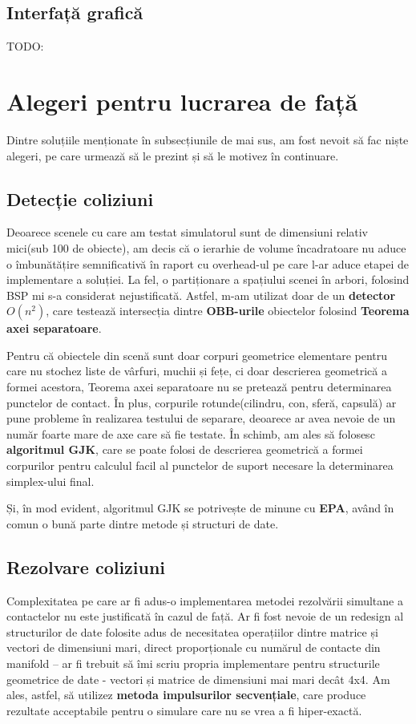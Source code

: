 \documentclass[12pt,a4paper]{report}
\begin{document}
\subsection{Interfață grafică}
TODO:
\section{Alegeri pentru lucrarea de față}

Dintre soluțiile menționate în subsecțiunile de mai sus, am fost nevoit să fac niște alegeri, pe care urmează să le prezint și să le motivez în continuare.

\subsection{Detecție coliziuni}

Deoarece scenele cu care am testat simulatorul sunt de dimensiuni relativ mici(sub 100 de obiecte), am decis că o ierarhie de volume încadratoare nu aduce o îmbunătățire semnificativă în raport cu overhead-ul pe care l-ar aduce etapei de implementare a soluției. La fel, o partiționare a spațiului scenei în arbori, folosind BSP mi s-a considerat nejustificată. Astfel, m-am utilizat doar de un \textbf{detector $O(n^2)$}, care testează intersecția dintre \textbf{OBB-urile} obiectelor folosind \textbf{Teorema axei separatoare}.

Pentru că obiectele din scenă sunt doar corpuri geometrice elementare pentru care nu stochez liste de vârfuri, muchii și fețe, ci doar descrierea geometrică a formei acestora, Teorema axei separatoare nu se pretează pentru determinarea punctelor de contact. În plus, corpurile rotunde(cilindru, con, sferă, capsulă) ar pune probleme în realizarea testului de separare, deoarece ar avea nevoie de un număr foarte mare de axe care să fie testate. În schimb, am ales să folosesc \textbf{algoritmul GJK}, care se poate folosi de descrierea geometrică a formei corpurilor pentru calculul facil al punctelor de suport necesare la determinarea simplex-ului final.

Și, în mod evident, algoritmul GJK se potrivește de minune cu \textbf{EPA}, având în comun o bună parte dintre metode și structuri de date.

\subsection{Rezolvare coliziuni}

Complexitatea pe care ar fi adus-o implementarea metodei rezolvării simultane a contactelor nu este justificată în cazul de față. Ar fi fost nevoie de un redesign al structurilor de date folosite adus de necesitatea operațiilor dintre matrice și vectori de dimensiuni mari, direct proporționale cu numărul de contacte din manifold -- ar fi trebuit să îmi scriu propria implementare pentru structurile geometrice de date - vectori și matrice de dimensiuni mai mari decât 4x4. Am ales, astfel, să utilizez \textbf{metoda impulsurilor secvențiale}, care produce rezultate acceptabile pentru o simulare care nu se vrea a fi hiper-exactă.
\end{document}
